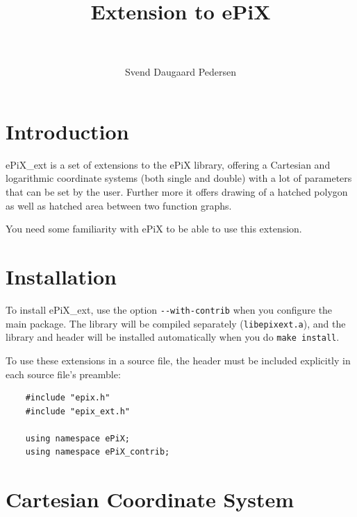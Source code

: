 \documentclass[12pt,a4paper]{article}
\begin{document}
  \lstset{language=C++,
          extendedchars=true,
          showstringspaces=false,
          stringstyle = \ttfamily,
          basicstyle=\footnotesize
         }

  \thispagestyle{empty}

  \title{\Huge \textbf{Extension to ePiX}}
  \author{\\ \\ Svend Daugaard Pedersen}
  \maketitle

  \newpage
  \tableofcontents
  \newpage

  \pagestyle{headings}  %

  \section{Introduction}

  ePiX\_ext is a set of extensions to the ePiX library, offering a
  Cartesian and logarithmic coordinate systems (both single and
  double) with a lot of parameters that can be set by the
  user. Further more it offers drawing of a hatched polygon as well as
  hatched area between two function graphs.

  You need some familiarity with ePiX to be able to use this extension.

  \section{Installation}

  To install ePiX\_ext, use the option \verb+--with-contrib+ when
  you configure the main package.  The library will be compiled
  separately (\texttt{libepixext.a}), and the library and header will
  be installed automatically when you do \texttt{make install}.

  To use these extensions in a source file, the header must be
  included explicitly in each source file's preamble:
  \begin{verbatim}
    #include "epix.h"
    #include "epix_ext.h"

    using namespace ePiX;
    using namespace ePiX_contrib;
  \end{verbatim}

  \section{Cartesian Coordinate System}
\end{document}
